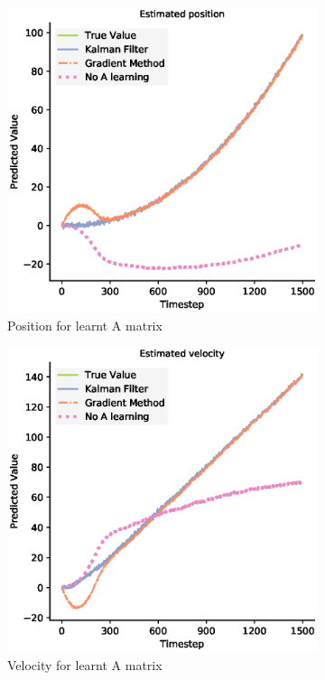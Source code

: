 \begin{figure}[H]
  \begin{subfigure}{0.33\textwidth}
    \centering
    \includegraphics[width=.8\linewidth]{chapter_3_figures/Estimated_position_A_matrix.eps}
    \caption{Position for learnt A matrix}
  \end{subfigure}%
  \begin{subfigure}{0.33\textwidth}
    \centering
    \includegraphics[width=.8\linewidth]{chapter_3_figures/Estimated_velocity_A_matrix.eps}
    \caption{Velocity for learnt A matrix}
  \end{subfigure}
  \begin{subfigure}{0.33\textwidth}\quad

\end{subfigure}
\end{figure}
